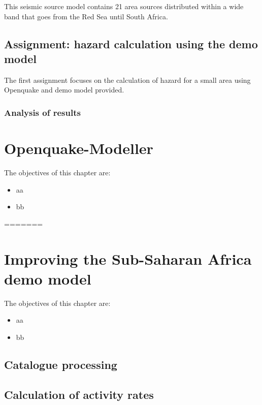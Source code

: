 \documentclass[11pt,a4paper,headings=small,dvips]{scrbook}
\newenvironment{myfancybox}{%
  \def\FrameCommand{\fboxsep=\FrameSep \fcolorbox{blue01}{honeydew}}%
  \color{black}\MakeFramed {\FrameRestore}}%
 {\endMakeFramed}
\begin{document}
This seismic source model contains 21 area sources distributed within a wide 
band that goes from the Red Sea until South Africa.

\section{Assignment: hazard calculation using the demo model}
The first assignment focuses on the calculation of hazard for a small area 
using Openquake and demo model provided.

\subsection{Analysis of results}
\cleardoublepage
\chapter{Openquake-Modeller}
\begin{myfancybox}
The objectives of this chapter are:
\begin{itemize}
    \item aa
    \item bb
\end{itemize}
\end{myfancybox}
=======
  
\cleardoublepage
\chapter{Improving the Sub-Saharan Africa demo model}
\begin{myfancybox}
The objectives of this chapter are:
\begin{itemize}
    \item aa
    \item bb
\end{itemize}
\end{myfancybox}
\section{Catalogue processing}
\section{Calculation of activity rates}
\end{document}

